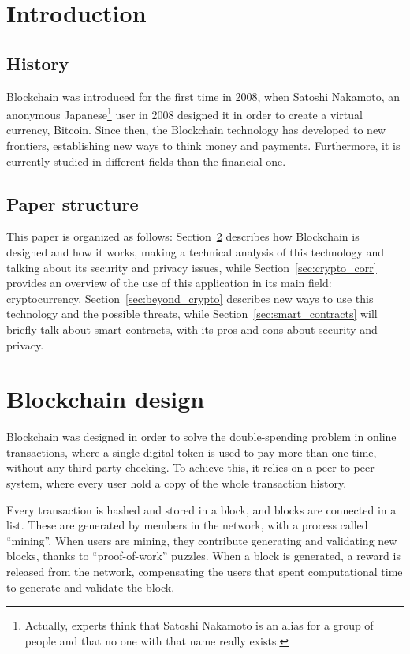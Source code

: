 \section{Introduction}

\subsection{History}
Blockchain was introduced for the first time in 2008, when Satoshi
Nakamoto, an anonymous Japanese\footnote{Actually, experts think that Satoshi
Nakamoto is an alias for a group of people and that no one with that name
really exists.} user in 2008 designed it in order to create a virtual currency,
Bitcoin. Since then, the Blockchain technology has developed to new frontiers,
establishing new ways to think money and payments. Furthermore, it is currently
studied in different fields than the financial one.

\subsection{Paper structure}

This paper is organized as follows: Section~\ref{sec:block_design} describes
how Blockchain is designed and how it works, making a technical analysis of this
technology and talking about its security and privacy issues, while
Section~\ref{sec:crypto_corr} provides an overview of the
use of this application in its main field: cryptocurrency.
Section~\ref{sec:beyond_crypto} describes new ways to use this technology and
the possible threats, while Section~\ref{sec:smart_contracts} will briefly talk
about smart contracts, with its pros and cons about security and privacy.

\section{Blockchain design}
\label{sec:block_design}
Blockchain was designed in order to solve the double-spending problem in
online transactions, where a single digital token is used to pay more than one
time, without any third party checking\cite{nakamoto08}. To achieve this, it
relies on a peer-to-peer system, where every user hold a copy of the whole
transaction history.

Every transaction is hashed and stored in a block, and blocks are connected in
a list. These are generated by members in the network, with a process called
``mining''. When users are mining, they contribute generating and validating
new blocks, thanks to ``proof-of-work'' puzzles. When a block is
generated, a reward is released from the network, compensating the users that
spent computational time to generate and validate the block.

